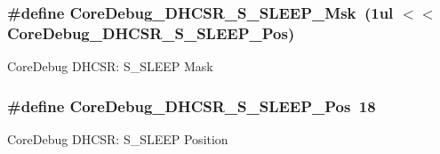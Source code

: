 \subsubsection[{\texorpdfstring{Core\+Debug\+\_\+\+D\+H\+C\+S\+R\+\_\+\+S\+\_\+\+S\+L\+E\+E\+P\+\_\+\+Msk}{CoreDebug_DHCSR_S_SLEEP_Msk}}]{\setlength{\rightskip}{0pt plus 5cm}\#define Core\+Debug\+\_\+\+D\+H\+C\+S\+R\+\_\+\+S\+\_\+\+S\+L\+E\+E\+P\+\_\+\+Msk~(1ul $<$$<$ Core\+Debug\+\_\+\+D\+H\+C\+S\+R\+\_\+\+S\+\_\+\+S\+L\+E\+E\+P\+\_\+\+Pos)}\hypertarget{group__CMSIS__CM3__CoreDebug_ga98d51538e645c2c1a422279cd85a0a25}{}\label{group__CMSIS__CM3__CoreDebug_ga98d51538e645c2c1a422279cd85a0a25}
Core\+Debug D\+H\+C\+SR\+: S\+\_\+\+S\+L\+E\+EP Mask 
\subsubsection[{\texorpdfstring{Core\+Debug\+\_\+\+D\+H\+C\+S\+R\+\_\+\+S\+\_\+\+S\+L\+E\+E\+P\+\_\+\+Pos}{CoreDebug_DHCSR_S_SLEEP_Pos}}]{\setlength{\rightskip}{0pt plus 5cm}\#define Core\+Debug\+\_\+\+D\+H\+C\+S\+R\+\_\+\+S\+\_\+\+S\+L\+E\+E\+P\+\_\+\+Pos~18}\hypertarget{group__CMSIS__CM3__CoreDebug_ga349ccea33accc705595624c2d334fbcb}{}\label{group__CMSIS__CM3__CoreDebug_ga349ccea33accc705595624c2d334fbcb}
Core\+Debug D\+H\+C\+SR\+: S\+\_\+\+S\+L\+E\+EP Position 